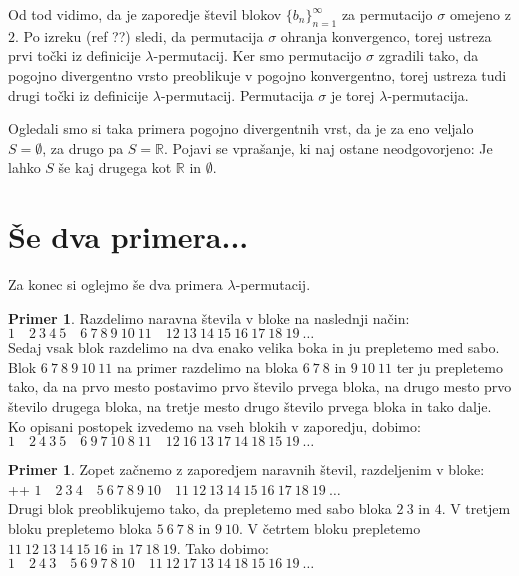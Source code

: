 \documentclass[12pt,a4paper,reqno]{amsart}
\theoremstyle{definition} %
\newtheorem{primer}[definicija]{Primer}
\theoremstyle{plain} %
\newcommand{\R}{\mathbb R}
\begin{document}
Od tod vidimo, da je zaporedje števil blokov $\{b_n\}_{n=1}^{\infty}$ za permutacijo $\sigma$ omejeno z $2$. %
Po izreku (ref ??) sledi, da permutacija $\sigma$ ohranja konvergenco, torej ustreza prvi točki iz definicije $\lambda$-permutacij. Ker smo permutacijo $\sigma$ zgradili tako, da pogojno divergentno vrsto preoblikuje v pogojno konvergentno, torej ustreza tudi drugi točki iz definicije $\lambda$-permutacij. Permutacija $\sigma$ je torej $\lambda$-permutacija.

Ogledali smo si taka primera pogojno divergentnih vrst, da je za eno veljalo $S=\emptyset$, za drugo pa $S=\R$. Pojavi se vprašanje, ki naj ostane neodgovorjeno: Je lahko $S$ še kaj drugega kot $\R$ in $\emptyset$.

\section{Še dva primera...}

Za konec si oglejmo še dva primera $\lambda$-permutacij.

\begin{primer}
Razdelimo naravna števila v bloke na naslednji način:\\

$1 \quad 2\: 3\: 4\: 5 \quad 6\: 7\: 8\: 9\: 10\: 11 \quad 12\: 13\: 14\: 15\: 16\: 17\: 18\: 19\: \ldots $\\

Sedaj vsak blok razdelimo na dva enako velika boka in ju prepletemo med sabo. Blok $6\: 7\: 8\: 9\: 10\: 11$ na primer razdelimo na bloka $6\: 7\: 8$ in $9\: 10\: 11$ ter ju prepletemo tako, da na prvo mesto postavimo prvo število prvega bloka, na drugo mesto prvo število drugega bloka, na tretje mesto drugo število prvega bloka in tako dalje. Ko opisani postopek izvedemo na vseh blokih v zaporedju, dobimo:\\ %

$1 \quad 2\: 4\: 3\: 5 \quad 6\: 9\: 7\: 10\: 8\: 11 \quad 12\: 16\: 13\: 17\: 14\: 18\: 15\: 19\: \ldots $
\end{primer}

\begin{primer}
Zopet začnemo z zaporedjem naravnih števil, razdeljenim v bloke:\\
++
$1 \quad 2\: 3\: 4\quad 5\: 6\: 7\: 8\: 9\: 10 \quad 11\: 12\: 13\: 14\: 15\: 16\:17\: 18\: 19\: \ldots $\\

Drugi blok preoblikujemo tako, da prepletemo med sabo bloka $2\: 3$ in $4$. V tretjem bloku prepletemo bloka $5\: 6\: 7\: 8$ in $9\: 10$. V četrtem bloku prepletemo $11\: 12\: 13\: 14\: 15\: 16$ in $17\: 18\: 19$. Tako dobimo:\\%

$1 \quad 2\: 4\: 3\quad 5\: 6\: 9\: 7\: 8\: 10 \quad 11\: 12\: 17\: 13\: 14\: 18\: 15\: 16\: 19\: \ldots $
\end{primer}
\end{document}
